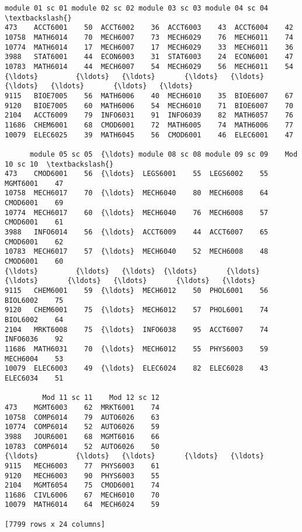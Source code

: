 \documentclass[11pt]{article}
\makeatletter
\newcommand{\boxspacing}{\kern\kvtcb@left@rule\kern\kvtcb@boxsep}
\newcommand{\prompt}[4]{
        \ttfamily\llap{{\color{#2}[#3]:\hspace{3pt}#4}}\vspace{-\baselineskip}
    }
\makeatother
\begin{document}
            \begin{tcolorbox}[breakable, size=fbox, boxrule=.5pt, pad at break*=1mm, opacityfill=0]
\prompt{Out}{outcolor}{12}{\boxspacing}
\begin{Verbatim}[commandchars=\\\{\}]
      module 01 sc 01 module 02 sc 02 module 03 sc 03 module 04 sc 04  \textbackslash{}
473    ACCT6001    50  ACCT6002    36  ACCT6003    43  ACCT6004    42
10758  MATH6014    70  MECH6007    73  MECH6029    76  MECH6011    74
10774  MATH6014    17  MECH6007    17  MECH6029    33  MECH6011    36
3988   STAT6001    44  ECON6003    31  STAT6003    24  ECON6001    47
10783  MATH6014    44  MECH6007    54  MECH6029    56  MECH6011    54
{\ldots}         {\ldots}   {\ldots}       {\ldots}   {\ldots}       {\ldots}   {\ldots}       {\ldots}   {\ldots}
9115   BIOE7005    56  MATH6006    40  MECH6010    35  BIOE6007    67
9120   BIOE7005    60  MATH6006    54  MECH6010    71  BIOE6007    70
2104   ACCT6009    79  INFO6031    91  INFO6039    82  MATH6057    76
11686  CHEM6001    68  CMOD6001    72  MATH6005    74  MATH6006    77
10079  ELEC6025    39  MATH6045    56  CMOD6001    46  ELEC6001    47

      module 05 sc 05  {\ldots} module 08 sc 08 module 09 sc 09    Mod 10 sc 10  \textbackslash{}
473    CMOD6001    56  {\ldots}  LEGS6001    55  LEGS6002    55  MGMT6001    47
10758  MECH6017    70  {\ldots}  MECH6040    80  MECH6008    64  CMOD6001    69
10774  MECH6017    60  {\ldots}  MECH6040    76  MECH6008    57  CMOD6001    61
3988   INFO6014    56  {\ldots}  ACCT6009    44  ACCT6007    65  CMOD6001    62
10783  MECH6017    57  {\ldots}  MECH6040    52  MECH6008    48  CMOD6001    60
{\ldots}         {\ldots}   {\ldots}  {\ldots}       {\ldots}   {\ldots}       {\ldots}   {\ldots}       {\ldots}   {\ldots}
9115   CHEM6001    59  {\ldots}  MECH6012    50  PHOL6001    56  BIOL6002    75
9120   CHEM6001    75  {\ldots}  MECH6012    57  PHOL6001    74  BIOL6002    64
2104   MRKT6008    75  {\ldots}  INFO6038    95  ACCT6007    74  INFO6036    92
11686  MATH6031    70  {\ldots}  MECH6012    55  PHYS6003    59  MECH6004    53
10079  ELEC6003    49  {\ldots}  ELEC6024    82  ELEC6028    43  ELEC6034    51

         Mod 11 sc 11    Mod 12 sc 12
473    MGMT6003    62  MRKT6001    74
10758  COMP6014    79  AUTO6026    63
10774  COMP6014    52  AUTO6026    59
3988   JOUR6001    68  MGMT6016    66
10783  COMP6014    52  AUTO6026    50
{\ldots}         {\ldots}   {\ldots}       {\ldots}   {\ldots}
9115   MECH6003    77  PHYS6003    61
9120   MECH6003    90  PHYS6003    55
2104   MGMT6054    75  CMOD6001    74
11686  CIVL6006    67  MECH6010    70
10079  MATH6014    64  MECH6024    59

[7799 rows x 24 columns]
\end{Verbatim}
\end{tcolorbox}
        
\end{document}
